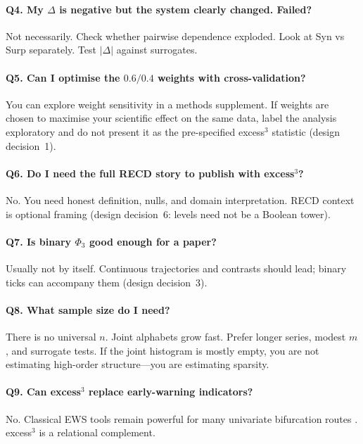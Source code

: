 \documentclass[11pt,a4paper]{article}
\begin{document}
\paragraph{Q4. My $\Delta$ is negative but the system clearly changed. Failed?}
Not necessarily. Check whether pairwise dependence exploded. Look at
Syn vs Surp separately. Test $|\Delta|$ against surrogates.

\paragraph{Q5. Can I optimise the $0.6/0.4$ weights with cross-validation?}
You can explore weight sensitivity in a methods supplement. If weights are
chosen to maximise your scientific effect on the same data, label the
analysis exploratory and do not present it as the pre-specified excess$^3$
statistic (design decision~1).

\paragraph{Q6. Do I need the full RECD story to publish with excess$^3$?}
No. You need honest definition, nulls, and domain interpretation. RECD
context is optional framing (design decision~6: levels need not be a
Boolean tower).

\paragraph{Q7. Is binary $\Phi_3$ good enough for a paper?}
Usually not by itself. Continuous trajectories and contrasts should lead;
binary ticks can accompany them (design decision~3).

\paragraph{Q8. What sample size do I need?}
There is no universal $n$. Joint alphabets grow fast. Prefer longer series,
modest $m$, and surrogate tests. If the joint histogram is mostly empty,
you are not estimating high-order structure---you are estimating sparsity.

\paragraph{Q9. Can excess$^3$ replace early-warning indicators?}
No. Classical EWS tools remain powerful for many univariate bifurcation
routes \citep{Scheffer2009}. excess$^3$ is a relational complement.
\end{document}
